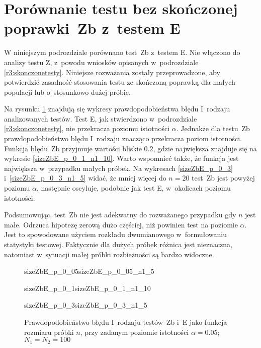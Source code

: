 \section{Porównanie testu bez skończonej poprawki~Zb z~testem E}

W niniejszym podrozdziale porównano test~Zb z~testem E. Nie włączono do analizy testu Z, z~powodu wniosków opisanych w~podrozdziale \ref{r3:skonczonetesty}. Niniejsze rozważania zostały przeprowadzone, aby potwierdzić zasadność stosowania testu ze skończoną poprawką dla małych populacji lub o~stosunkowo dużej próbie.

Na rysunku \ref{sizeZbE_n} znajdują się wykresy prawdopodobieństwa błędu I~rodzaju analizowanych testów. Test E, jak stwierdzono w~podrozdziale \ref{r3:skonczonetesty}, nie przekracza poziomu istotności $\alpha$. Jednakże dla testu~Zb prawdopodobieństwo błędu I~rodzaju znacząco przekracza poziom istotności. Funkcja błędu~Zb przyjmuje wartości bliskie $0.2$, gdzie największa znajduje się na wykresie \ref{sizeZbE_p_0_1_n1_10}. Warto wspomnieć także, że funkcja jest największa w~przypadku małych próbek. Na wykresach \ref{sizeZbE_p_0_3} i~\ref{sizeZbE_p_0_3_n1_5} widać, że mniej więcej do $n=20$ test~Zb jest powyżej poziomu $\alpha$, następnie oscyluje, podobnie jak test E, w~okolicach poziomu istotności. 

Podsumowując, test~Zb nie jest adekwatny do rozważanego przypadku gdy $n$ jest małe. Odrzuca hipotezę zerową dużo częściej, niż powinien test na poziomie $\alpha$. Jest to spowodowane użyciem rozkładu dwumianowego w~formułowaniu statystyki testowej. Faktycznie dla dużych próbek różnica jest nieznaczna, natomiast w~sytuacji małej próbki rozbieżności są bardzo widoczne.

\begin{figure}[!h]
	\begin{subdiagrams}{sizeZbE_p_0_05}{sizeZbE_p_0_05_n1_5}
	\end{subdiagrams}
	
	\begin{subdiagrams}{sizeZbE_p_0_1}{sizeZbE_p_0_1_n1_10}
	\end{subdiagrams}
	
	\begin{subdiagrams}{sizeZbE_p_0_3}{sizeZbE_p_0_3_n1_5}
	\end{subdiagrams}
	\caption{Prawdopodobieństwo błędu I~rodzaju testów~Zb i~E jako funkcja rozmiaru próbki $n$, przy zadanym poziomie istotności $\alpha=0.05$; $N_1=N_2=100$}
	\label{sizeZbE_n}
\end{figure}

